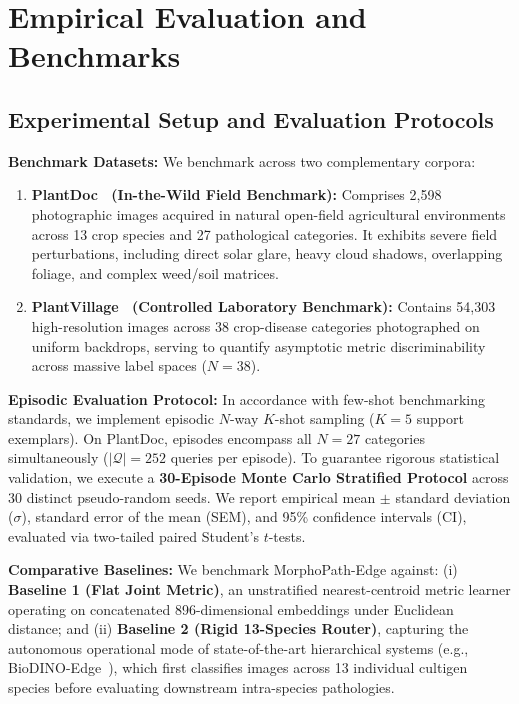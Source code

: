 \section{Empirical Evaluation and Benchmarks}
\label{sec:experiments}

\subsection{Experimental Setup and Evaluation Protocols}
\label{subsec:exp_setup}

\noindent\textbf{Benchmark Datasets:} We benchmark across two complementary corpora:
\begin{enumerate}
    \item \textbf{PlantDoc~\cite{singh2020plantdoc} (In-the-Wild Field Benchmark):} Comprises 2,598 photographic images acquired in natural open-field agricultural environments across 13 crop species and 27 pathological categories. It exhibits severe field perturbations, including direct solar glare, heavy cloud shadows, overlapping foliage, and complex weed/soil matrices.
    \item \textbf{PlantVillage~\cite{hughes2015open} (Controlled Laboratory Benchmark):} Contains 54,303 high-resolution images across 38 crop-disease categories photographed on uniform backdrops, serving to quantify asymptotic metric discriminability across massive label spaces ($N=38$).
\end{enumerate}

\noindent\textbf{Episodic Evaluation Protocol:} In accordance with few-shot benchmarking standards, we implement episodic $N$-way $K$-shot sampling ($K=5$ support exemplars). On PlantDoc, episodes encompass all $N=27$ categories simultaneously ($|\mathcal{Q}| = 252$ queries per episode). To guarantee rigorous statistical validation, we execute a \textbf{30-Episode Monte Carlo Stratified Protocol} across 30 distinct pseudo-random seeds. We report empirical mean $\pm$ standard deviation ($\sigma$), standard error of the mean (SEM), and 95\% confidence intervals (CI), evaluated via two-tailed paired Student's $t$-tests.

\noindent\textbf{Comparative Baselines:} We benchmark MorphoPath-Edge against: (i) \textbf{Baseline 1 (Flat Joint Metric)}, an unstratified nearest-centroid metric learner operating on concatenated 896-dimensional embeddings under Euclidean distance; and (ii) \textbf{Baseline 2 (Rigid 13-Species Router)}, capturing the autonomous operational mode of state-of-the-art hierarchical systems (e.g., BioDINO-Edge~\cite{alsaadi2026biodino}), which first classifies images across 13 individual cultigen species before evaluating downstream intra-species pathologies.


